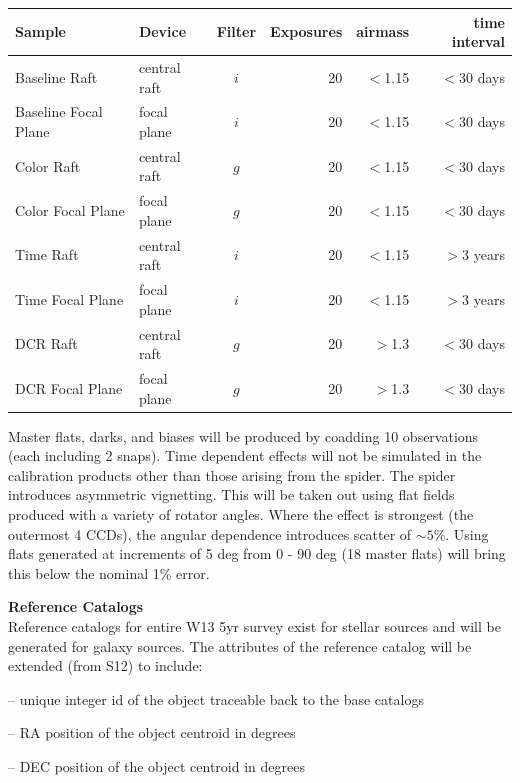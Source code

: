 \documentclass[prd, nofootinbib, floatfix, 11pt,tightenlines,times]{article}
\begin{document}
\begin{table}
\begin{center}
\begin{tabular}{llcrrr}
Sample & Device & Filter & Exposures & airmass & time interval \\
\hline  
Baseline Raft              & central raft  & $i$  & 20 & $<$1.15 &$<$30 days \\
Baseline Focal Plane   & focal plane  &  $i$ & 20 & $<$1.15 &$<$30
days \\
\hline  
Color Raft              & central raft  & $g$  & 20 & $<$1.15 &$<$30 days \\
Color Focal Plane   & focal plane  &  $g$ & 20 & $<$1.15 &$<$30 days \\
\hline 
Time Raft              & central raft  & $i$  & 20 & $<$1.15 &$>$3 years \\
Time Focal Plane   & focal plane  &  $i$ & 20 & $<$1.15 &$>$3 years \\
\hline 
DCR Raft              & central raft  & $g$  & 20 & $>$1.3 &$<$30 days \\
DCR Focal Plane   & focal plane  & $g$  & 20 & $>$1.3 &$<$30 days
\end{tabular}
\end{center}
\end{table}



Master flats, darks, and biases will be produced by coadding 10
observations (each including 2 snaps).  Time dependent effects will not be
simulated in the calibration products other than those arising from
the spider. The spider introduces asymmetric vignetting.  This will be
taken out using flat fields produced with a variety of rotator angles.
Where the effect is strongest (the outermost 4 CCDs), the angular
dependence introduces scatter of $\sim 5$\%.  Using flats generated at
increments of 5 deg from 0 - 90 deg (18 master flats) will bring this
below the nominal 1\% error.


{\bf Reference Catalogs}\\
Reference catalogs for entire W13 5yr survey exist for stellar sources
and will be generated for galaxy sources. The attributes of the
reference catalog will be extended (from S12) to include:

-- unique integer id of the object traceable back to the base catalogs

-- RA position of the object centroid in degrees

-- DEC position of the object centroid in degrees
\end{document}
